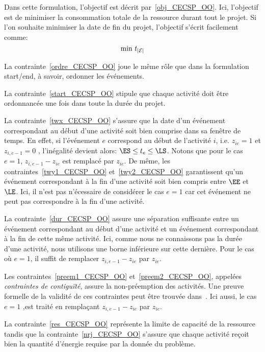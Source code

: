 Dans cette formulation, l'objectif est décrit
par~\eqref{obj_CECSP_OO}. Ici, l'objectif est de minimiser la
consommation totale de la ressource durant tout le projet. Si 
l'on souhaite minimiser la date de fin du projet, l'objectif s'écrit 
facilement comme: 
\begin{equation}
\text{min } t_{|{\cal E}|} \notag
\end{equation} 

La contrainte~\eqref{ordre_CECSP_OO} joue le même rôle que dans la
formulation start/end, à savoir, ordonner les événements.

La contrainte~\eqref{start_CECSP_OO} stipule que chaque activité doit
être ordonnancée une fois dans toute la durée du projet.
 
La contrainte~\eqref{twx_CECSP_OO} s'assure que la date d'un événement
correspondant au début d'une activité soit bien comprise dans sa
fenêtre de temps.  En effet, si l'événement $e$ correspond au début de
l'activité $i$, i.e. $z_{ie}=1$ et $z_{i,e-1}=0$ , l'inégalité devient
alors: $\ES \le t_e \le \LS$. Notons que pour le cas $e=1$,
$z_{i,e-1}-z_{ie}$ est remplacé par $z_{ie}$. De même, les
contraintes~\eqref{twy1_CECSP_OO} et~\eqref{twy2_CECSP_OO}
garantissent qu'un événement correspondant à la fin d'une activité
soit bien compris entre $\EE$ et $\LE$. Ici, il n'est pas
n'écessaire de considérer le cas $e=1$ car cet événement ne peut pas
correspondre à la fin d'une activité. 

La contrainte~\eqref{dur_CECSP_OO} assure une séparation suffisante
entre un événement correspondant au début d'une activité et un
événement correspondant à la fin de cette même activité. Ici, comme
nous ne connaissons pas la durée d'une activité, nous utilisons une
borne inférieure sur cette dernière. Pour le cas où $e=1$, il suffit
de remplacer $z_{i,e-1}-z_{ie}$ par $z_{ie}$.

Les contraintes~\eqref{preem1_CECSP_OO} et~\eqref{preem2_CECSP_OO},
appelées {\it contraintes de contiguïté}, assure la non-préemption des
activités. Une preuve formelle de la validité de ces contraintes peut
être trouvée dans~\cite{modele_RCPSP}. Ici aussi, le cas $e=1$ ,est
traité en remplaçant $z_{i,e-1}-z_{ie}$ par $z_{ie}$.

La contrainte~\eqref{res_CECSP_OO} représente la limite de capacité de
la ressource tandis que la contrainte~\eqref{nrj_CECSP_OO} s'assure
que chaque activité reçoit bien la quantité d'énergie requise par la
donnée du problème.

